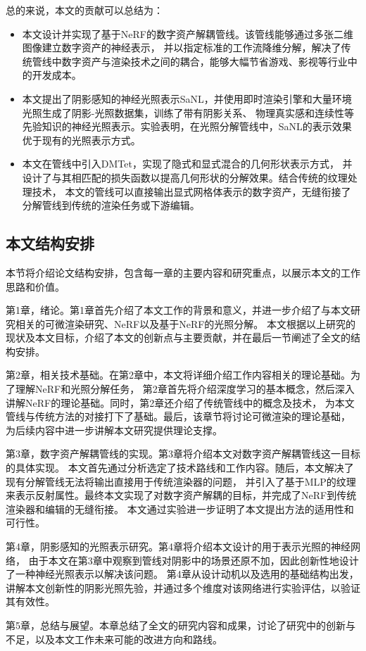 总的来说，本文的贡献可以总结为：

\begin{itemize}
  \item 本文设计并实现了基于NeRF的数字资产解耦管线。该管线能够通过多张二维图像建立数字资产的神经表示，
  并以指定标准的工作流降维分解，解决了传统管线中数字资产与渲染技术之间的耦合，能够大幅节省游戏、影视等行业中的开发成本。
  \item 本文提出了阴影感知的神经光照表示SaNL，并使用即时渲染引擎和大量环境光照生成了阴影-光照数据集，训练了带有阴影关系、
  物理真实感和连续性等先验知识的神经光照表示。实验表明，在光照分解管线中，SaNL的表示效果优于现有的光照表示方式。
  \item 本文在管线中引入DMTet，实现了隐式和显式混合的几何形状表示方式，
  并设计了与其相匹配的损失函数以提高几何形状的分解效果。结合传统的纹理处理技术，
  本文的管线可以直接输出显式网格体表示的数字资产，无缝衔接了分解管线到传统的渲染任务或下游编辑。
\end{itemize}

\subsection{本文结构安排}
本节将介绍论文结构安排，包含每一章的主要内容和研究重点，以展示本文的工作思路和价值。

第1章，绪论。第1章首先介绍了本文工作的背景和意义，并进一步介绍了与本文研究相关的可微渲染研究、NeRF以及基于NeRF的光照分解。
本文根据以上研究的现状及本文目标，介绍了本文的创新点与主要贡献，并在最后一节阐述了全文的结构安排。

第2章，相关技术基础。在第2章中，本文将详细介绍工作内容相关的理论基础。为了理解NeRF和光照分解任务，
第2章首先将介绍深度学习的基本概念，然后深入讲解NeRF的理论基础。同时，第2章还介绍了传统管线中的概念及技术，
为本文管线与传统方法的对接打下了基础。最后，该章节将讨论可微渲染的理论基础，
为后续内容中进一步讲解本文研究提供理论支撑。

第3章，数字资产解耦管线的实现。第3章将介绍本文对数字资产解耦管线这一目标的具体实现。
本文首先通过分析选定了技术路线和工作内容。随后，本文解决了现有分解管线无法将输出直接用于传统渲染器的问题，
并引入了基于MLP的纹理来表示反射属性。最终本文实现了对数字资产解耦的目标，并完成了NeRF到传统渲染器和编辑的无缝衔接。
本文通过实验进一步证明了本文提出方法的适用性和可行性。

第4章，阴影感知的光照表示研究。第4章将介绍本文设计的用于表示光照的神经网络，
由于本文在第3章中观察到管线对阴影中的场景还原不加，因此创新性地设计了一种神经光照表示以解决该问题。
第4章从设计动机以及选用的基础结构出发，讲解本文创新性的阴影光照先验，并通过多个维度对该网络进行实验评估，以验证其有效性。

第5章，总结与展望。本章总结了全文的研究内容和成果，讨论了研究中的创新与不足，以及本文工作未来可能的改进方向和路线。

